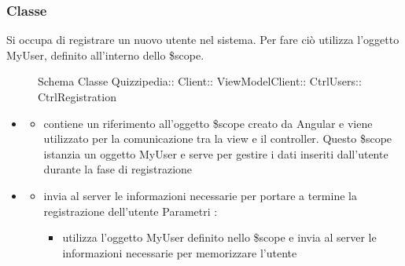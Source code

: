 \subsubsection{Classe }
Si occupa di registrare un nuovo utente nel sistema. Per fare ciò utilizza l'oggetto MyUser, definito all'interno dello \$scope.
\begin{figure}[H]
\centering
\noindent{}
\caption[Schema Classe CtrlRegistration]{Schema Classe Quizzipedia:: Client:: ViewModelClient:: CtrlUsers:: CtrlRegistration}
\end{figure}
\begin{itemize}
\item {}
\begin{itemize}
\item {}
\newline
contiene un riferimento all'oggetto \$scope creato da Angular e viene utilizzato per la comunicazione tra la view e il controller. Questo \$scope istanzia un oggetto MyUser e serve per gestire i dati inseriti dall'utente durante la fase di registrazione
\end{itemize}
\item {}
\begin{itemize}
\item {}
\newline
invia al server le informazioni necessarie per portare a termine la registrazione dell'utente
\newline
Parametri :
\begin{itemize}
\item {}
\newline
utilizza l'oggetto MyUser definito nello \$scope e invia al server le informazioni necessarie per memorizzare l'utente
\end{itemize}
\end{itemize}
\end{itemize}
